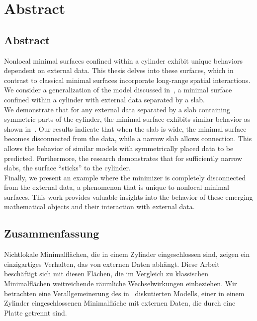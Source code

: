 \chapter{Abstract}
\label{ch:abstract}

\section*{Abstract}

Nonlocal minimal surfaces confined within a cylinder exhibit unique behaviors dependent on external
data. This thesis delves into these surfaces, which in contrast to classical minimal surfaces
incorporate long-range spatial interactions. We consider a generalization of the model discussed
in~\cite{dipierro2020disconnectedness}, a minimal surface confined within a cylinder with external
data separated by a slab. \\ 

We demonstrate that for any external data separated by a slab containing symmetric parts of the
cylinder, the minimal surface exhibits similar behavior as shown
in~\cite{dipierro2020disconnectedness}. Our results indicate that when the slab is wide, the minimal
surface becomes disconnected from the data, while a narrow slab allows connection. This allows the
behavior of similar models with symmetrically placed data to be predicted. Furthermore, the research
demonstrates that for sufficiently narrow slabs, the surface \enquote{sticks} to the cylinder. \\ 

Finally, we present an example where the minimizer is completely disconnected from the external
data, a phenomenon that is unique to nonlocal minimal surfaces. This work provides valuable insights
into the behavior of these emerging mathematical objects and their interaction with external data.


\section*{Zusammenfassung}

Nichtlokale Minimalflächen, die in einem Zylinder eingeschlossen sind, zeigen ein einzigartiges
Verhalten, das von externen Daten abhängt. Diese Arbeit beschäftigt sich mit diesen Flächen, die im
Vergleich zu klassischen Minimalflächen weitreichende räumliche Wechselwirkungen einbeziehen. Wir
betrachten eine Verallgemeinerung des in~\cite{dipierro2020disconnectedness} diskutierten Modells,
einer in einem Zylinder eingeschlossenen Minimalfläche mit externen Daten, die durch eine Platte
getrennt sind. \\

